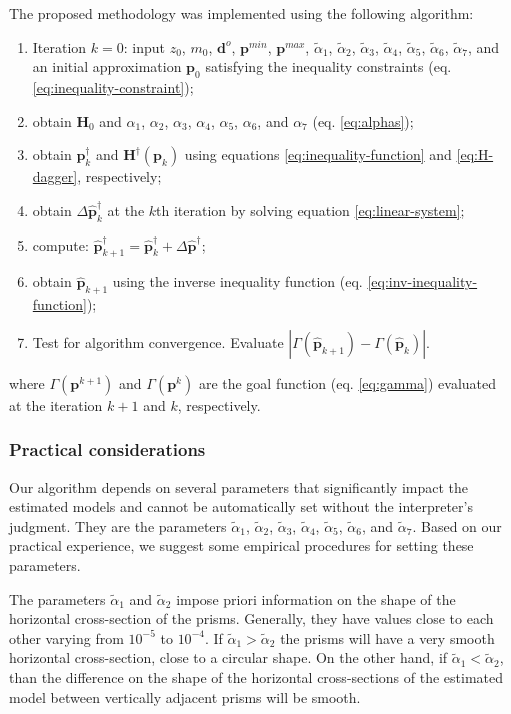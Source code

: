 The proposed methodology was implemented using the following algorithm:

\begin{enumerate}
	\item Iteration $k = 0$: input $z_0$, $m_0$, $\mathbf{d}^o$, $\mathbf{p}^{min}$, $\mathbf{p}^{max}$, $\tilde{\alpha}_1$, $\tilde{\alpha}_2$, $\tilde{\alpha}_3$, $\tilde{\alpha}_4$, $\tilde{\alpha}_5$, $\tilde{\alpha}_6$, $\tilde{\alpha}_7$, and an initial approximation $\mathbf{p}_0$ satisfying the inequality constraints (eq. \ref{eq:inequality-constraint});
	\item obtain $\mathbf{H}_0$ and $\alpha_1$, $\alpha_2$, $\alpha_3$, $\alpha_4$, $\alpha_5$, $\alpha_6$, and $\alpha_7$ (eq. \ref{eq:alphas});
	\item obtain $\mathbf{p}^\dagger_k$ and $\mathbf{H}^\dagger(\mathbf{p}_k)$ using equations \ref{eq:inequality-function} and \ref{eq:H-dagger}, respectively;
	\item obtain $\Delta\hat{\mathbf{p}}^{\dagger}_k$ at the $k$th iteration by solving equation \ref{eq:linear-system};
	\item compute: $\hat{\mathbf{p}}_{k+1}^{\dagger} = \hat{\mathbf{p}}^{\dagger}_k + \Delta\hat{\mathbf{p}}^{\dagger}$;
	\item obtain $\hat{\mathbf{p}}_{k+1}$ using the inverse inequality function (eq. \ref{eq:inv-inequality-function});
	\item Test for algorithm convergence. Evaluate $\left|\Gamma(\hat{\mathbf{p}}_{k+1}) - \Gamma(\hat{\mathbf{p}}_k)\right|$.
\end{enumerate}
where  $ \Gamma(\mathbf{p}^{k+1}) $ and $\Gamma(\mathbf{p}^{k})$ are the goal function (eq. \ref{eq:gamma}) evaluated at the iteration $k+1$ and $k$, respectively.

\subsubsection{Practical considerations}

Our algorithm depends on several parameters that significantly impact the estimated models and cannot be automatically set without the interpreter’s judgment. They are the parameters $\tilde{\alpha}_1$, $\tilde{\alpha}_2$, $\tilde{\alpha}_3$, $\tilde{\alpha}_4$, $\tilde{\alpha}_5$, $\tilde{\alpha}_6$, and $\tilde{\alpha}_7$. Based on our practical experience, we suggest some empirical procedures for setting these parameters.

The parameters $\tilde{\alpha}_1$ and $\tilde{\alpha}_2$ impose priori information on the shape of the horizontal cross-section of the prisms. Generally, they have values close to each other varying from $10^{-5}$ to $10^{-4}$. If $\tilde{\alpha}_1 > \tilde{\alpha}_2$ the prisms will have a very smooth horizontal cross-section, close to a circular shape. On the other hand, if $\tilde{\alpha}_1 < \tilde{\alpha}_2$, than the difference on the shape of the horizontal cross-sections of the estimated model between vertically adjacent prisms will be smooth.

